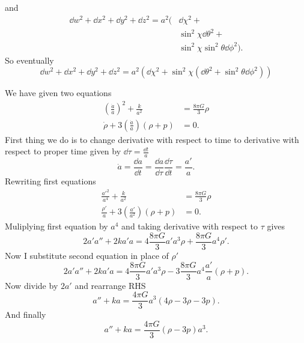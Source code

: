 %
and
%
\begin{align*}
    \dd w^2 + \dd x^2 + \dd y^2 + \dd z^2 = a^2( & \dd \chi^2 +                           \\
                                                 & \sin^2 \chi \dd \theta^2 +             \\
                                                 & \sin^2 \chi \sin^2 \theta \dd \phi^2).
\end{align*}
%
So eventually
%
\begin{equation}
    \boxed{\dd w^2 + \dd x^2 + \dd y^2 + \dd z^2 =
        a^2\left( \dd \chi^2 +
        \sin^2 \chi \left(\dd \theta^2 +
        \sin^2 \theta \dd \phi^2\right)\right)}
\end{equation}

\problem

\subproblem

We have given two equations
%
\begin{subequations}
    \begin{align}
        \left(\frac{\dot{a}}{a}\right)^2 + \frac{k}{a^2}         & = \frac{8\pi G}{3} \rho \\
        \dot{\rho} + 3 \left(\frac{\dot{a}}{a}\right) (\rho + p) & = 0.
    \end{align}
\end{subequations}
%
First thing we do is to change derivative with respect to time to derivative
with respect to proper time given by $\dd \tau = \frac{\dd t}{a}$
%
\begin{equation}
    \dot{a} = \frac{\dd a}{\dd t} =
    \frac{\dd a}{\dd \tau} \frac{\dd \tau}{\dd t} =
    \frac{a'}{a}.
\end{equation}
%
Rewriting first equations
%
\begin{subequations}
    \begin{align}
        \frac{a'^{2}}{a^4} + \frac{k}{a^2}                         & = \frac{8\pi G}{3} \rho \\
        \frac{\rho'}{a} + 3 \left(\frac{a'}{a^2}\right) (\rho + p) & = 0.
        \label{eq:ass9_rho}
    \end{align}
\end{subequations}
%
Muliplying first equation by $a^4$ and taking derivative with respect to $\tau$
gives
%
\begin{equation}
    2 a' a'' + 2k a' a =
    4\frac{8\pi G}{3} a' a^3 \rho + \frac{8\pi G}{3} a^4 \rho'.
\end{equation}
%
Now I substitute second equation in place of $\rho'$
%
\begin{equation}
    2 a' a'' + 2k a' a =
    4\frac{8\pi G}{3} a' a^3 \rho - 3\frac{8\pi G}{3} a^4 \frac{a'}{a} (\rho + p).
\end{equation}
%
Now divide by $2a'$ and rearrange RHS
%
\begin{equation}
    a'' + k a =
    \frac{4\pi G}{3} a^3 \left(4 \rho - 3 \rho - 3p \right).
\end{equation}
%
And finally
%
\begin{equation}
    \boxed{a'' + k a =
        \frac{4\pi G}{3} \left(\rho - 3p \right) a^3.}
    \label{eq:ass9_sol}
\end{equation}


